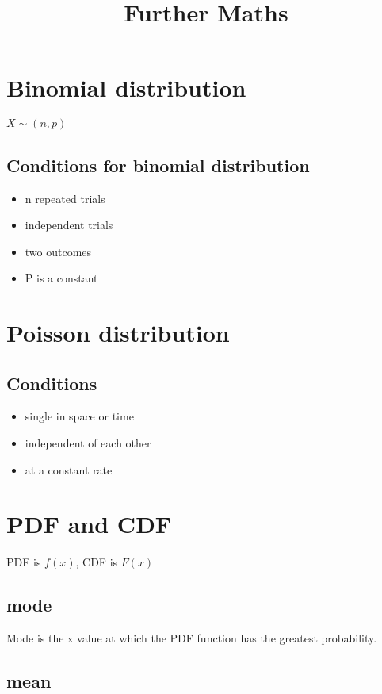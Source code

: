 \documentclass[a4paper,9pt]{scrartcl}
\title{Further Maths}
\begin{document}
    \section{Binomial distribution}

    \begin{math}
        X \sim \left( n, p \right)
    \end{math}

    \subsection{Conditions for binomial distribution}

    \begin{itemize}
        \item n repeated trials
        \item independent trials
        \item two outcomes
        \item P is a constant
    \end{itemize}


    \section{Poisson distribution}

    \subsection{Conditions}
    \begin{itemize}
        \item single in space or time
        \item independent of each other
        \item at a constant rate
    \end{itemize}


    \section{PDF and CDF}

    PDF is $f(x)$, CDF is $F(x)$

    \subsection{mode}

    Mode is the x value at which the PDF function has the greatest probability.

    \subsection{mean}
\end{document}
